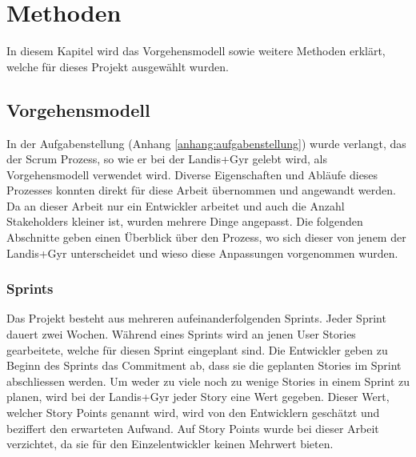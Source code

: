 \chapter{Methoden}




In diesem Kapitel wird das Vorgehensmodell sowie weitere Methoden erklärt, welche für dieses Projekt ausgewählt wurden.

\section{Vorgehensmodell}\label{vorgehen}
In der Aufgabenstellung (Anhang \ref{anhang:aufgabenstellung}) wurde verlangt, das der Scrum Prozess, so wie er bei der Landis+Gyr gelebt wird, als Vorgehensmodell verwendet wird.
Diverse Eigenschaften und Abläufe dieses Prozesses konnten direkt für diese Arbeit übernommen und angewandt werden.
Da an dieser Arbeit nur ein Entwickler arbeitet und auch die Anzahl Stakeholders kleiner ist, wurden mehrere Dinge angepasst.
Die folgenden Abschnitte geben einen Überblick über den Prozess, wo sich dieser von jenem der Landis+Gyr unterscheidet und wieso diese Anpassungen vorgenommen wurden.

\subsection{Sprints}
Das Projekt besteht aus mehreren aufeinanderfolgenden Sprints.
Jeder Sprint dauert zwei Wochen.
Während eines Sprints wird an jenen User Stories gearbeitete, welche für diesen Sprint eingeplant sind.
Die Entwickler geben zu Beginn des Sprints das Commitment ab, dass sie die geplanten Stories im Sprint abschliessen werden.
Um weder zu viele noch zu wenige Stories in einem Sprint zu planen, wird bei der Landis+Gyr jeder Story eine Wert gegeben.
Dieser Wert, welcher Story Points genannt wird, wird von den Entwicklern geschätzt und beziffert den erwarteten Aufwand.
Auf Story Points wurde bei dieser Arbeit verzichtet, da sie für den Einzelentwickler keinen Mehrwert bieten.


